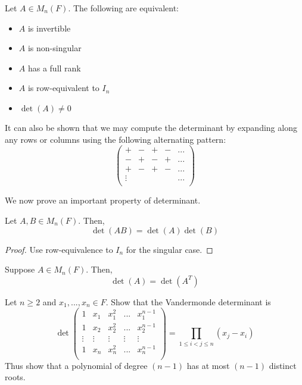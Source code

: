 \documentclass[11pt]{article}
\begin{document}
\begin{theorem}
  Let \(A\in M_n(F)\). The following are equivalent:
  \begin{itemize}
    \item \(A\) is invertible
    \item \(A\) is non-singular
    \item \(A\) has a full rank
    \item \(A\) is row-equivalent to \(I_n\)
    \item \(\det(A)\neq 0\)
  \end{itemize}
\end{theorem}

It can also be shown that we may compute the determinant by expanding along any rows or columns using the following alternating pattern:
\[\begin{pmatrix}
  +&-&+&-&...\\
  -&+&-&+&...\\
  +&-&+&-&...\\
  \vdots&&&&...\\
\end{pmatrix}\]

We now prove an important property of determinant.
\begin{theorem}
  Let \(A,B\in M_n(F)\). Then,
  \[\det(AB)=\det(A)\det(B)\]
\end{theorem}
\begin{proof}
  Use row-equivalence to \(I_n\) for the singular case.
\end{proof}

\begin{theorem}
  Suppose \(A\in M_n(F)\). Then,
  \[\det(A)=\det(A^T)\]
\end{theorem}

\begin{problem}
  Let \(n\geq 2\) and \(x_1,...,x_n\in F\). Show that the Vandermonde determinant is
  \[\det\begin{pmatrix}
    1&x_1&x_1^2&...&x_1^{n-1}\\
    1&x_2&x_2^2&...&x_2^{n-1}\\
    \vdots&\vdots&\vdots&\vdots&\vdots\\
    1&x_n&x_n^2&...&x_n^{n-1}\\
  \end{pmatrix}=\prod_{1\leq i<j\leq n}(x_j-x_i)\]
  Thus show that a polynomial of degree \((n-1)\) has at most \((n-1)\) distinct roots.
\end{problem}
\end{document}
